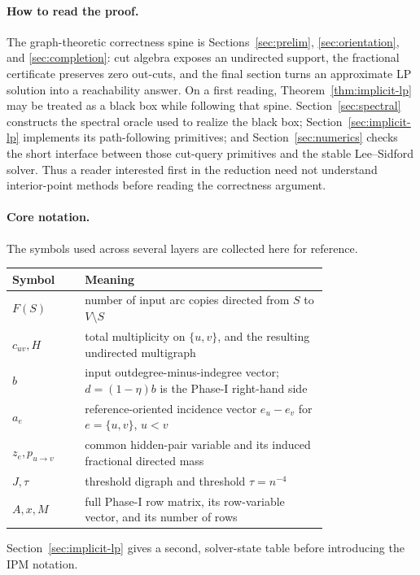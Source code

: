\documentclass[11pt]{article}
\theoremstyle{definition}
\begin{document}
\paragraph{How to read the proof.}
The graph-theoretic correctness spine is
Sections~\ref{sec:prelim}, \ref{sec:orientation}, and
\ref{sec:completion}: cut algebra exposes an undirected support, the
fractional certificate preserves zero out-cuts, and the final section turns
an approximate LP solution into a reachability answer.  On a first reading,
Theorem~\ref{thm:implicit-lp} may be treated as a black box while following
that spine.  Section~\ref{sec:spectral} constructs the spectral oracle used
to realize the black box; Section~\ref{sec:implicit-lp} implements its
path-following primitives; and Section~\ref{sec:numerics} checks the short
interface between those cut-query primitives and the stable Lee--Sidford
solver.  Thus a
reader interested first in the reduction need not understand interior-point
methods before reading the correctness argument.

\paragraph{Core notation.}
The symbols used across several layers are collected here for reference.
\begin{center}
\small
\begin{tabular}{@{}lp{0.77\linewidth}@{}}
\toprule
Symbol & Meaning\\
\midrule
$F(S)$ & number of input arc copies directed from $S$ to $V\setminus S$\\
$c_{uv},H$ & total multiplicity on $\{u,v\}$, and the resulting undirected multigraph\\
$b$ & input outdegree-minus-indegree vector; $d=(1-\eta)b$ is the Phase-I right-hand side\\
$a_e$ & reference-oriented incidence vector $e_u-e_v$ for $e=\{u,v\}$, $u<v$\\
$z_e,p_{u\to v}$ & common hidden-pair variable and its induced fractional directed mass\\
$J,\tau$ & threshold digraph and threshold $\tau=n^{-4}$\\
$A,x,M$ & full Phase-I row matrix, its row-variable vector, and its number of rows\\
\bottomrule
\end{tabular}
\end{center}
Section~\ref{sec:implicit-lp} gives a second, solver-state table before
introducing the IPM notation.
\end{document}
